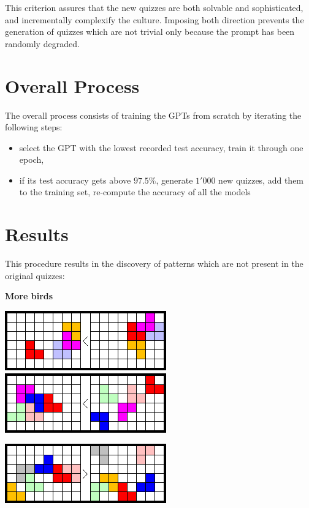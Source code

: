\documentclass[11pt,a4paper,oneside]{article}
\begin{document}
This criterion assures that the new quizzes are both solvable and
sophisticated, and incrementally complexify the culture. Imposing both
direction prevents the generation of quizzes which are not trivial
only because the prompt has been randomly degraded.

\section{Overall Process}

The overall process consists of training the GPTs from scratch by
iterating the following steps:
%
\begin{itemize}

\item select the GPT with the lowest recorded test accuracy, train it through one epoch,

\item if its test accuracy gets above $97.5\%$, generate $1'000$ new
  quizzes, add them to the training set, re-compute the accuracy of
  all the models

\end{itemize}

\section{Results}

This procedure results in the discovery of patterns which are not
present in the original quizzes:

\textbf{More birds}

\begin{center}
\includegraphics[scale=0.35]{pics/4_birds_1.png}
\includegraphics[scale=0.35]{pics/5_birds_1.png}

\includegraphics[scale=0.35]{pics/6_birds_1.png}
\end{center}
\end{document}
